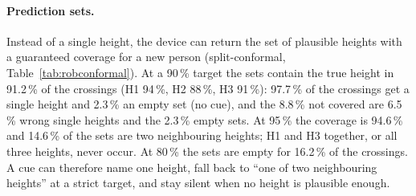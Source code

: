 \paragraph{Prediction sets.} Instead of a single height, the device can return the set of plausible heights with a guaranteed
coverage for a new person (split-conformal, Table~\ref{tab:robconformal}). At a 90\,\% target the sets contain the true height in
91.2\,\% of the crossings (H1 94\,\%, H2 88\,\%, H3 91\,\%): 97.7\,\% of the crossings get a single height and 2.3\,\% an empty
set (no cue), and the 8.8\,\% not covered are 6.5\,\% wrong single heights and the 2.3\,\% empty sets. At 95\,\% the coverage is
94.6\,\% and 14.6\,\% of the sets are two neighbouring heights; H1 and H3 together, or all three heights, never occur. At 80\,\%
the sets are empty for 16.2\,\% of the crossings. A cue can therefore name one height, fall back to ``one of two neighbouring
heights'' at a strict target, and stay silent when no height is plausible enough.

\begin{table}[htbp]
\centering
\caption{Sampling rate: balanced accuracy (95\,\% CI) when every signal is averaged over its last $m$ samples and decimated from
60\,Hz to 30, 20, 15 and 10\,Hz.}
\label{tab:robrate}

\end{table}

\begin{table}[htbp]
\centering
\caption{Sensor noise: mean balanced accuracy over three draws of independent Gaussian noise added to every sample (min--max in
brackets).}
\label{tab:robnoise}

\end{table}

\begin{table}[htbp]
\centering
\caption{Model size, random forests of the device model: balanced accuracy and memory (12 bytes per tree node, both limbs).}
\label{tab:robforest}

\end{table}

\begin{table}[htbp]
\centering
\caption{Model size, logistic regression with the $k$ best features per limb (chosen inside each training set): balanced accuracy
and memory.}
\label{tab:roblogistic}

\end{table}

\begin{table}[htbp]
\centering
\caption{Conformal prediction sets: observed coverage overall and per class, mean set size, and share of the crossings by set
type (in brackets: single height and right).}
\label{tab:robconformal}

\end{table}

